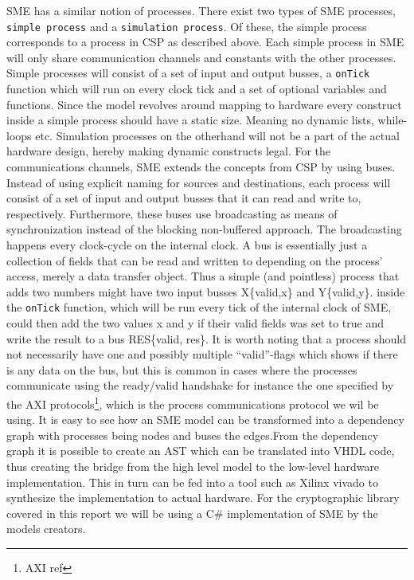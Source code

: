 \documentclass[a4paper]{article}
\begin{document}
SME has a similar notion of processes. There exist two types of SME processes, \texttt{simple process} and a \texttt{simulation process}. Of these, the simple process corresponds to a process in CSP as described above. Each simple process in SME will only share communication channels and constants with the other processes. Simple processes will consist of a set of input and output busses, a \texttt{onTick} function which will run on every clock tick and a set of optional variables and functions. Since the model revolves around mapping to hardware every construct inside a simple process should have a static size. Meaning no dynamic lists, while-loops etc. Simulation processes on the otherhand will not be a part of the actual hardware design, hereby making dynamic constructs legal.
For the communications channels, SME extends the concepts from CSP by using buses. Instead of using explicit naming for sources and destinations, each process will consist of a set of input and output busses that it can read and write to, respectively. Furthermore, these buses use broadcasting as means of synchronization instead of the blocking non-buffered approach.  The broadcasting happens every clock-cycle on the internal clock.
A bus is essentially just a collection of fields that can be read and written to depending on the process' access, merely a data transfer object. Thus a simple (and pointless) process that adds two numbers might have two input busses X\{valid,x\} and Y\{valid,y\}. inside the \texttt{onTick} function, which will be run every tick of the internal clock of SME, could then add the two values x and y if their valid fields was set to true and write the result to a bus RES\{valid, res\}. It is worth noting that a process should not necessarily have one and possibly multiple ``valid''-flags which shows if there is any data on the bus, but this is common in cases where the processes communicate using the ready/valid handshake for instance the one specified by the AXI protocols\footnote{AXI ref}, which is the process communications protocol we wil be using. It is easy to see how an SME model can be transformed into a dependency graph with processes being nodes and buses the edges.From the dependency graph it is possible to create an AST which can be translated into VHDL code\cite{SME}, thus creating the bridge from the high level model to the low-level hardware implementation. This in turn can be fed into a tool such as Xilinx vivado to synthesize the implementation to actual hardware. For the cryptographic library covered in this report we will be using a C\# implementation of SME by the models creators\cite{SME}.
\end{document}
